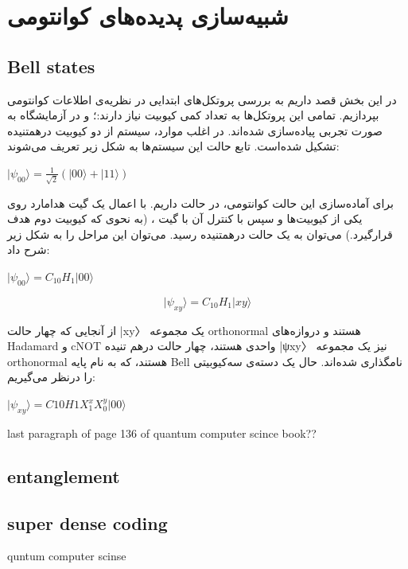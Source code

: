 \documentclass{book}
\begin{document}
\chapter{شبیه‌سازی پدیده‌های کوانتومی}
\section{Bell states}
در این بخش قصد داریم به بررسی پروتکل‌های ابتدایی در نظریه‌ی اطلاعات کوانتومی بپردازیم. تمامی این پروتکل‌ها به تعداد کمی کیوبیت نیاز دارند:؛ و در آزمایشگاه به صورت تجربی پیاده‌سازی شده‌اند. در اغلب موارد، سیستم از دو کیوبیت درهمتنیده تشکیل شده‌است. تابع حالت این سیستم‌ها به شکل زیر تعریف می‌شوند:
\begin{center}
	$\vert \psi_{00} \rangle = \frac{1}{\sqrt{2}}(|00\rangle + |11\rangle)$
\end{center}
برای آماده‌سازی این حالت کوانتومی‌، در حالت  داریم. با اعمال یک گیت هدامارد روی یکی از کیوبیت‌ها و سپس با کنترل‌ آن با گیت ، (به نحوی که کیوبیت دوم هدف قرارگیرد.) می‌توان به یک حالت درهمتنیده رسید. می‌توان این مراحل را به شکل زیر شرح داد:
\begin{center}
	$\vert\psi_{00}\rangle = C_{10}H_{1}\vert00\rangle$
\end{center}

\[
\vert\psi_{xy}\rangle = C_{10}H_{1}\vert xy \rangle
\]

از آنجایی که چهار حالت |xy〉 یک مجموعه orthonormal هستند و دروازه‌های Hadamard و cNOT واحدی هستند، چهار حالت درهم تنیده |ψxy〉 نیز یک مجموعه orthonormal هستند، که به نام پایه Bell نامگذاری شده‌اند. حال یک دسته‌ی سه‌کیوبیتی را درنظر ‌می‌گیریم:

\begin{center}
$\vert \psi_{xy}\rangle = C10H1X^{x}_{1} X^{y}_{0} \vert00\rangle$\\
\end{center}

last paragraph of page 136 of quantum computer scince book??\\
\section{entanglement}
\section{super dense coding}
quntum computer scinse
\end{document}
